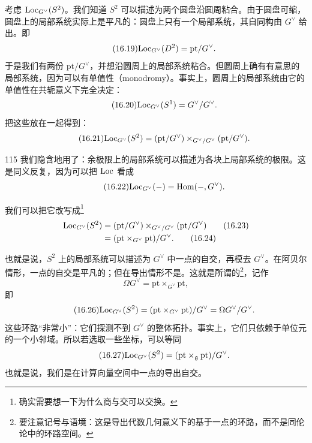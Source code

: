考虑 $\mathrm{Loc}_{G^\vee}(S^2)$。我们知道 $S^2$ 可以描述为两个圆盘沿圆周粘合。由于圆盘可缩，圆盘上的局部系统实际上是平凡的：圆盘上只有一个局部系统，其自同构由 $G^\vee$ 给出。即
\begin{equation}\tag{16.19}
\mathrm{Loc}_{G^\vee}(D^2)=\mathrm{pt}/G^\vee.
\end{equation}
于是我们有两份 $\mathrm{pt}/G^\vee$，并想沿圆周上的局部系统粘合。但圆周上确有有意思的局部系统，因为可以有单值性（monodromy）。事实上，圆周上的局部系统由它的单值性在共轭意义下完全决定：
\begin{equation}\tag{16.20}
\mathrm{Loc}_{G^\vee}(S^1)=G^\vee/G^\vee.
\end{equation}
把这些放在一起得到：
\begin{equation}\tag{16.21}
\mathrm{Loc}_{G^\vee}(S^2)=(\mathrm{pt}/G^\vee)\times_{G^\vee/G^\vee}(\mathrm{pt}/G^\vee).
\end{equation}

\begin{srcrem}{115}
我们隐含地用了：余极限上的局部系统可以描述为各块上局部系统的极限。这是同义反复，因为可以把 $\mathrm{Loc}$ 看成
\begin{equation}\tag{16.22}
\mathrm{Loc}_{G^\vee}(-)=\mathrm{Hom}(-,G^\vee).
\end{equation}
\end{srcrem}

我们可以把它改写成\footnote{确实需要想一下为什么商与交可以交换。}
\begin{align}
\mathrm{Loc}_{G^\vee}(S^2)&=(\mathrm{pt}/G^\vee)\times_{G^\vee/G^\vee}(\mathrm{pt}/G^\vee)\tag{16.23}\\
&=(\mathrm{pt}\times_{G^\vee}\mathrm{pt})/G^\vee.\tag{16.24}
\end{align}

也就是说，$S^2$ 上的局部系统可以描述为 $G^\vee$ 中一点的自交，再模去 $G^\vee$。在阿贝尔情形，一点的自交是平凡的；但在导出情形不是。这就是所谓的\footnote{要注意记号与语境：这是导出代数几何意义下的基于一点的环路，而不是同伦论中的环路空间。}，记作
\begin{equation}\tag{16.25}
\Omega G^\vee=\mathrm{pt}\times_{G^\vee}\mathrm{pt},
\end{equation}
即
\begin{equation}\tag{16.26}
\mathrm{Loc}_{G^\vee}(S^2)=(\mathrm{pt}\times_{G^\vee}\mathrm{pt})/G^\vee=\Omega G^\vee/G^\vee.
\end{equation}
这些环路“非常小”：它们探测不到 $G^\vee$ 的整体拓扑。事实上，它们只依赖于单位元的一个小邻域。所以若选取一些坐标，可以等同
\begin{equation}\tag{16.27}
\mathrm{Loc}_{G^\vee}(S^2)=(\mathrm{pt}\times_{\mathfrak{g}}\mathrm{pt})/G^\vee.
\end{equation}
也就是说，我们是在计算向量空间中一点的导出自交。%

